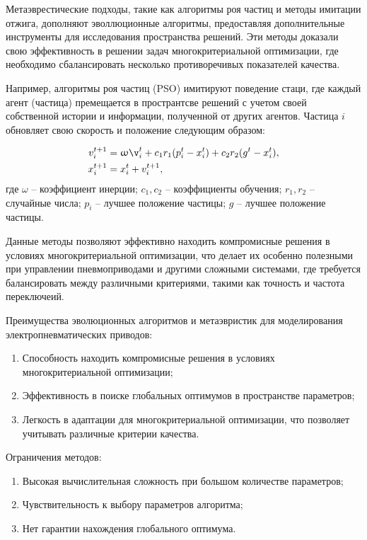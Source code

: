 Метаэврестические подходы, такие как алгоритмы роя частиц и методы имитации отжига,
дополняют эволлюционные алгоритмы, предоставляя дополнительные инструменты для
исследования пространства решений. Эти методы доказали свою эффективность в
решении задач многокритериальной оптимизации, где необходимо сбалансировать
несколько противоречивых показателей качества.

Например, алгоритмы роя частиц (PSO) имитируют поведение стаци, где каждый
агент (частица) премещается в пространтсве решений с учетом своей собственной
истории и информации, полученной от других агентов. Частица $i$ обновляет
свою скорость и положение следующим образом:

\begin{equation*}
    \begin{aligned}
        v_i^{t+1} & = \omega \v_i^t + c_1 r_1 (p_i^t - x_i^t) + c_2 r_2 (g^t - x_i^t), \\
        x_i^{t+1} & = x_i^t + v_i^{t+1},
    \end{aligned}
\end{equation*}
где $\omega$ -- коэффициент инерции;
$c_1, c_2$ -- коэффициенты обучения;
$r_1, r_2$ -- случайные числа;
$p_i$ -- лучшее положение частицы;
$g$ -- лучшее положение частицы.

Данные методы позволяют эффективно находить компромисные решения в условиях
многокритериальной оптимизации, что делает их особенно полезными при
управлении пневмоприводами и другими сложными системами, где требуется балансировать
между различными критериями, такими как точность и частота переключеий.

Преимущества эволюционных алгоритмов и метаэвристик для моделирования электропневматических приводов:

\begin{enumerate}
    \item Способность находить компромисные решения в условиях многокритериальной оптимизации;
    \item Эффективность в поиске глобальных оптимумов в пространстве параметров;
    \item Легкость в адаптации для многокритериальной оптимизации, что позволяет учитывать
          различные критерии качества.
\end{enumerate}

Ограничения методов:
\begin{enumerate}
    \item Высокая вычислительная сложность при большом количестве параметров;
    \item Чувствительность к выбору параметров алгоритма;
    \item Нет гарантии нахождения глобального оптимума.
\end{enumerate}

